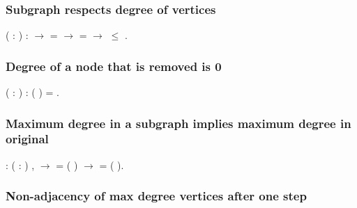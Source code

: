 \subsubsection{Subgraph respects degree of vertices}


\begin{coqdoccode}
\coqdocemptyline
\coqdocnoindent
{}  ( : )    :\coqdoceol
\coqdocindent{1.00em}
   \ensuremath{\rightarrow}    =   \ensuremath{\rightarrow}    =   \ensuremath{\rightarrow}  \ensuremath{\le} .\coqdoceol
\coqdocemptyline
\end{coqdoccode}
\subsubsection{Degree of a node that is removed is 0}


\begin{coqdoccode}
\coqdocnoindent
{}  ( : )  :\coqdoceol
\coqdocindent{1.00em}
  (  ) = .\coqdoceol
\coqdocemptyline
\end{coqdoccode}
\subsubsection{Maximum degree in a subgraph implies maximum degree in original}


\begin{coqdoccode}
\coqdocnoindent
{}  : \coqdockw{\ensuremath{\forall}} (  : ) ,\coqdoceol
\coqdocindent{2.00em}
   \ensuremath{\rightarrow}\coqdoceol
\coqdocindent{2.00em}
   =  ( ) \ensuremath{\rightarrow}\coqdoceol
\coqdocindent{2.00em}
   =  ( ).\coqdoceol
\coqdocemptyline
\end{coqdoccode}
\subsubsection{Non-adjacency of max degree vertices after one step}

